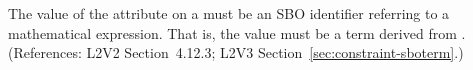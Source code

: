 The value of the  attribute on a \Constraint must be an SBO
identifier referring to a mathematical expression.  That is, the value must
be a term derived from \sbomathformula.  (References: L2V2 Section~4.12.3;
L2V3 Section~\ref{sec:constraint-sboterm}.)
